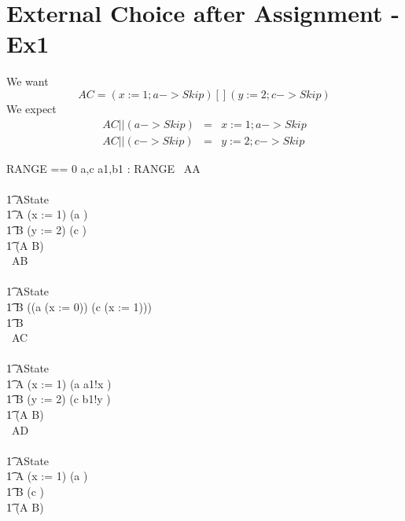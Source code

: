 \section{External Choice after Assignment - Ex1}

We want
\[
  AC = ( x:=1 ; a -> Skip ) [] (y:=2 ; c -> Skip)
\]
We expect
\begin{eqnarray}
   AC || (a -> Skip)  &=&  x:=1 ; a -> Skip
\\ AC || (c -> Skip)  &=&  y:=2 ; c -> Skip
\end{eqnarray}

\begin{circus}
RANGE == 0 
\also \circchannel a,c
\also \circchannel a1,b1 : RANGE
\also
\circprocess\ AA \circdef\\
\circbegin\\
\t1 \circstate AState \\
\t1 A \circdef (x := 1) \circseq (a \then \Skip) \\
\t1 B \circdef (y := 2) \circseq (c \then \Skip) \\
\t1 \circspot (A \extchoice B)\\
\circend
\also
\circprocess\ AB \circdef\\
\circbegin\\
\t1 \circstate AState \\
\t1 B \circdef ((a \then (x := 0)) \extchoice (c \then (x := 1))) \\
\t1 \circspot B\\
\circend
\also
\circprocess\ AC \circdef\\
\circbegin\\
\t1 \circstate AState \\
\t1 A \circdef (x := 1) \circseq (a \then a1!x \then \Skip) \\
\t1 B \circdef (y := 2) \circseq (c \then b1!y \then \Skip) \\
\t1 \circspot (A \extchoice B)\\
\circend
\also
\circprocess\ AD \circdef\\
\circbegin\\
\t1 \circstate AState \\
\t1 A \circdef (x := 1) \circseq (a \then \Skip) \\
\t1 B \circdef (c \then \Skip) \\
\t1 \circspot (A \extchoice B)\\
\circend
\end{circus}
